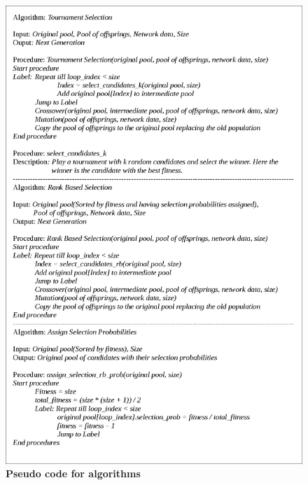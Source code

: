 \documentclass[a4paper, 12pt]{article}
\begin{document}
\begin{figure}[htbp]
\hspace*{0.1in}
\includegraphics[scale=0.65]{./diagram1.eps}
\caption{\textbf{Pseudo code for algorithms}}
\label{fig 2}
\end{figure}
\end{document}
